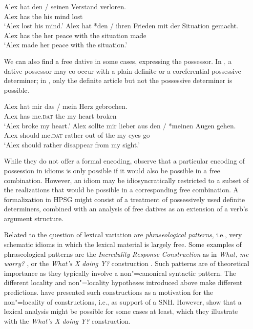 \documentclass[output=paper
                ,modfonts
                ,nonflat
	        ,collection
	        ,collectionchapter
	        ,collectiontoclongg
 	        ,biblatex
                ,babelshorthands
                ,newtxmath
                ,draftmode
                ,colorlinks, citecolor=brown
]{./langsci/langscibook}
\begin{document}
\eal \label{ex-verstand-herz}
\ex 
\gll Alex hat den / seinen Verstand verloren.\\
Alex has the {} his mind lost\\
\glt `Alex lost his mind.'\label{ex-verstand}
\ex 
\gll Alex hat *den / ihren Frieden mit der Situation gemacht.\\
     Alex has the {} her peace with the situation made\\
\glt `Alex made her peace with the situation.'\label{ex-frieden}
\zl 


We can also find a free dative in some cases, expressing the possessor. 
In , a dative possessor may co-occur with a plain definite or a coreferential possessive determiner; in , only the definite article but not the possessive determiner is possible.  


\eal \label{ex-herz-augen}
\ex 
\gll Alex hat mir das / mein Herz gebrochen.\\
Alex has me.\textsc{dat} the {} my heart broken\\
\glt `Alex broke my heart.'\label{ex-herz}
\ex 
\gll Alex sollte mir lieber aus den / *meinen Augen gehen.\\
Alex should me.\textsc{dat} rather {out of} the {} my eyes go\\
\glt `Alex should rather disappear from my sight.'\label{ex-augen}
\zl 

While they do not offer a formal encoding, \citet{Markantonatou:Sailer:16} observe that a particular encoding of possession in idioms is only possible if it would also be possible in a free combination. However, an idiom may be idiosyncratically restricted to a subset of the realizations that would be possible in a corresponding free combination. A formalization in HPSG might consist of a treatment of possessively used definite determiners, combined with an analysis of free datives as an extension of a verb's argument structure.

 

Related to the question of lexical variation are \emph{phraseological patterns}, i.e., very schematic idioms 
in which the lexical material is largely free. Some examples 
of phraseological patterns are
  the \emph{Incredulity Response Construction} as in \emph{What, me worry?} \citep{Akmajian:84,Lambrecht:90}, 
or the \emph{What's X doing Y?} construction \citep{KF99a}.
Such patterns are of theoretical importance as they typically involve a non"=canonical syntactic pattern. 
The different locality and non"=locality hypotheses introduced above make different predictions. 
\citet{FKoC88a} have presented such constructions as a motivation for the non"=locality of constructions, i.e., as support of a SNH. However, \citet{KF99a} show that a lexical analysis might be possible for some cases at least, which they illustrate with the \emph{What's X doing Y?} construction. 
\end{document}
